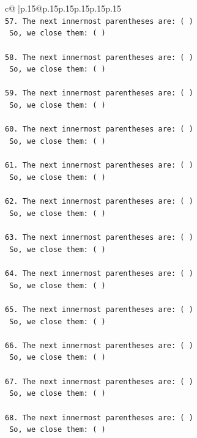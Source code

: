 \documentclass{article}
\begin{document}
{\begin{supertabular}{c@{$\;$}|p{.15\linewidth}@{}p{.15\linewidth}p{.15\linewidth}p{.15\linewidth}p{.15\linewidth}p{.15\linewidth}}
{{{\\ 
\texttt{57. The next innermost parentheses are: ( ) } \\
\texttt{    So, we close them: ( ) } \\
\\ 
\texttt{58. The next innermost parentheses are: ( ) } \\
\texttt{    So, we close them: ( ) } \\
\\ 
\texttt{59. The next innermost parentheses are: ( ) } \\
\texttt{    So, we close them: ( ) } \\
\\ 
\texttt{60. The next innermost parentheses are: ( ) } \\
\texttt{    So, we close them: ( ) } \\
\\ 
\texttt{61. The next innermost parentheses are: ( ) } \\
\texttt{    So, we close them: ( ) } \\
\\ 
\texttt{62. The next innermost parentheses are: ( ) } \\
\texttt{    So, we close them: ( ) } \\
\\ 
\texttt{63. The next innermost parentheses are: ( ) } \\
\texttt{    So, we close them: ( ) } \\
\\ 
\texttt{64. The next innermost parentheses are: ( ) } \\
\texttt{    So, we close them: ( ) } \\
\\ 
\texttt{65. The next innermost parentheses are: ( ) } \\
\texttt{    So, we close them: ( ) } \\
\\ 
\texttt{66. The next innermost parentheses are: ( ) } \\
\texttt{    So, we close them: ( ) } \\
\\ 
\texttt{67. The next innermost parentheses are: ( ) } \\
\texttt{    So, we close them: ( ) } \\
\\ 
\texttt{68. The next innermost parentheses are: ( ) } \\
\texttt{    So, we close them: ( ) } \\
}}}
\end{supertabular}}
\end{document}
